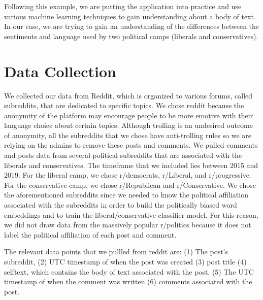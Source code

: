 \documentclass[conference]{IEEEtran}
\begin{document}
Following this example, we are putting the application into practice and use various machine learning techniques to gain understanding about a body of text. In our case, we are trying to gain an understanding of the differences between the sentiments and language used by two political camps (liberals and conservatives).

\section{Data Collection}
We collected our data from Reddit, which is organized to various forums, called subreddits, that are dedicated to specific topics. We chose reddit because the anonymity of the platform may encourage people to be more emotive with their language choice about certain topics. Although trolling is an undesired outcome of anonymity, all the subreddits that we chose have anti-trolling rules so we are relying on the admins to remove these posts and comments. We pulled comments and posts data from several political subreddits that are associated with the liberals and conservatives. The timeframe that we included lies between 2015 and 2019. For the liberal camp, we chose r/democrats, r/Liberal, and  r/progressive. For the conservative camp, we chose r/Republican and r/Conservative. We chose the aforementioned subreddits since we needed to know the political affiliation associated with the subreddits in order to build the politically biased word embeddings and to train the liberal/conservative classifier model. For this reason, we did not draw data from the massively popular r/politics because it does not label the political affiliation of each post and comment.
 
The relevant data points that we pullled from reddit are: (1) The post's subreddit, (2) UTC timestamp of when the post was created (3) post title (4) selftext, which contains the body of text associated with the post. (5) The UTC timestamp of when the comment was written (6) comments associated with the post.
\end{document}

